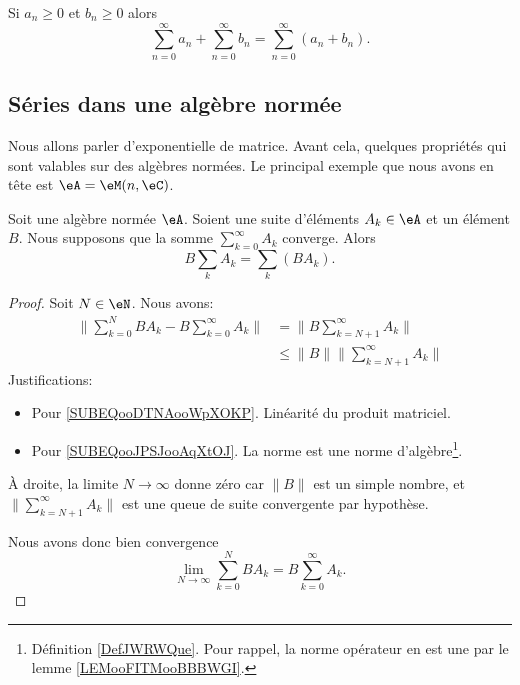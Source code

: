 \begin{proposition}		\label{PROPooQCOBooAMnljj}
	Si \( a_n\geq 0\) et \( b_n\geq 0\) alors
	\begin{equation}
		\sum_{n=0}^{\infty}a_n+\sum_{n=0}^{\infty}b_n=\sum_{n=0}^{\infty}(a_n+b_n).
	\end{equation}
\end{proposition}

\subsection{Séries dans une algèbre normée}

Nous allons parler d'exponentielle de matrice. Avant cela, quelques propriétés qui sont valables sur des algèbres normées. Le principal exemple que nous avons en tête est \( \eA=\eM(n,\eC)\).

\begin{proposition}      \label{PROPooMZZQooEhQsgQ}
	Soit une algèbre normée \( \eA\). Soient une suite d'éléments \( A_k\in \eA\) et un élément \( B\). Nous supposons que la somme \( \sum_{k=0}^{\infty}A_k\) converge. Alors
	\begin{equation}
		B\sum_kA_k=\sum_k(BA_k).
	\end{equation}
\end{proposition}

\begin{proof}
	Soit \( N\in \eN\). Nous avons:
	\begin{subequations}
		\begin{align}
			\| \sum_{k=0}^NBA_k-B\sum_{k=0}^{\infty}A_k \| & =\| B\sum_{k=N+1}^{\infty}A_k \|            \label{SUBEQooDTNAooWpXOKP} \\
			                                               & \leq \| B \|\| \sum_{k=N+1}^{\infty}A_k \|  \label{SUBEQooJPSJooAqXtOJ}
		\end{align}
	\end{subequations}
	Justifications:
	\begin{itemize}
		\item Pour \eqref{SUBEQooDTNAooWpXOKP}. Linéarité du produit matriciel.
		\item Pour \eqref{SUBEQooJPSJooAqXtOJ}. La norme est une norme d'algèbre\footnote{Définition \ref{DefJWRWQue}. Pour rappel, la norme opérateur en est une par le lemme \ref{LEMooFITMooBBBWGI}.}.
	\end{itemize}
	À droite, la limite \( N\to \infty\) donne zéro car \( \| B \|\) est un simple nombre, et \( \| \sum_{k=N+1}^{\infty}A_k \|\) est une queue de suite convergente par hypothèse.

	Nous avons donc bien convergence
	\begin{equation}
		\lim_{N\to \infty}\sum_{k=0}^{N}BA_k=B\sum_{k=0}^{\infty}A_k.
	\end{equation}
\end{proof}

